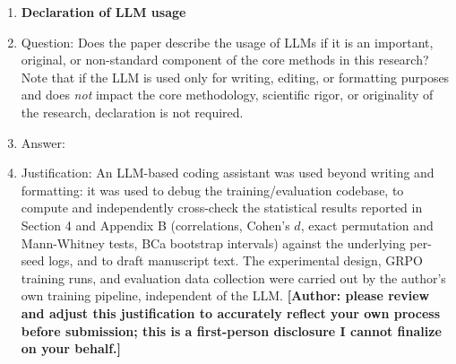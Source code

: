 \begin{enumerate}
\item {\bf Declaration of LLM usage}
    \item[] Question: Does the paper describe the usage of LLMs if it is an important, original, or non-standard component of the core methods in this research? Note that if the LLM is used only for writing, editing, or formatting purposes and does \emph{not} impact the core methodology, scientific rigor, or originality of the research, declaration is not required.
    \item[] Answer: \answerYes{}
    \item[] Justification: An LLM-based coding assistant was used beyond writing and formatting: it was used to debug the training/evaluation codebase, to compute and independently cross-check the statistical results reported in Section 4 and Appendix B (correlations, Cohen's $d$, exact permutation and Mann-Whitney tests, BCa bootstrap intervals) against the underlying per-seed logs, and to draft manuscript text. The experimental design, GRPO training runs, and evaluation data collection were carried out by the author's own training pipeline, independent of the LLM. \textbf{[Author: please review and adjust this justification to accurately reflect your own process before submission; this is a first-person disclosure I cannot finalize on your behalf.]}

\end{enumerate}
